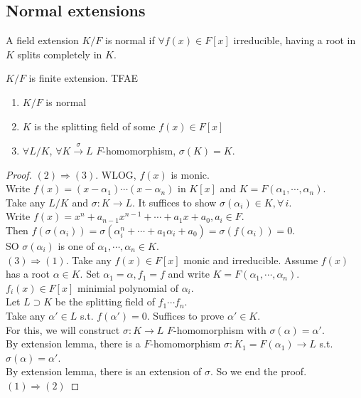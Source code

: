 \subsection{Normal extensions}
\begin{definition}
    A field extension  $ K/F $ is normal if  $ \forall f(x)\in F[x] $ irreducible, having a root in  $ K  $ splits completely in  $ K  $. 
\end{definition}
\begin{theorem}
     $ K/F $ is finite extension. TFAE
     \begin{enumerate}[(1)]
        \item  $ K/F  $ is normal
        \item  $ K  $ is the splitting field of some  $ f(x)\in F[x] $
        \item  $ \forall L/K $,  $ \forall K\xrightarrow{\sigma}L $  $ F $-homomorphism,  $ \sigma(K)=K $.     
     \end{enumerate} 
\end{theorem}
\begin{proof}
     $ (2)\Rightarrow (3) $. WLOG,  $ f(x)  $ is monic.\\
     Write  $ f(x)=(x-\alpha_1)\cdots(x-\alpha_n) $ in  $ K[x] $ and  $ K=F(\alpha_1,\cdots,\alpha_n) $.\\
     Take any  $ L/K $  and  $ \sigma :K\rightarrow L $. It suffices to show  $ \sigma(\alpha_i)\in K,\forall\, i $.\\
     Write  $ f(x)=x^n+a_{n-1}x^{n-1}+\cdots+a_1x+a_0, a_i\in F $.\\
     Then  $ f(\sigma(\alpha_i))=\sigma(\alpha_i^n+\cdots+a_1\alpha_i+a_0)=\sigma(f(\alpha_i))=0 $.\\
     SO  $ \sigma(\alpha_i) $ is one of  $ \alpha_1,\cdots,\alpha_n\in K $.\\
      $ (3)\Rightarrow (1) $. Take any  $ f(x)\in F[x] $ monic and irreducible. Assume  $ f(x) $ has a root  $ \alpha\in K $. Set  $ \alpha_1=\alpha,f_1=f $ and write  $ K=F(\alpha_1,\cdots,\alpha_n) $.  $ f_i(x)\in F[x] $ minimial polynomial of  $ \alpha_i $.\\
      Let  $ L\supset K  $ be the splitting field of  $ f_1\cdots f_n $.\\
      Take any  $ \alpha'\in L $ s.t.  $ f(\alpha')=0 $. Suffices to prove  $ \alpha'\in K $.\\
      For this, we will construct  $ \sigma:K\rightarrow L $  $ F $-homomorphism with  $ \sigma(\alpha)= \alpha'  $.\\
      By extension lemma, there is a  $ F  $-homomorphism  $ \sigma:K_1=F(\alpha_1)\rightarrow L $  s.t.  $ \sigma(\alpha)= \alpha'  $.\\
      By extension lemma, there is an extension of  $ \sigma $. So we end the proof.\\
       $ (1)\Rightarrow (2) $           
\end{proof}
